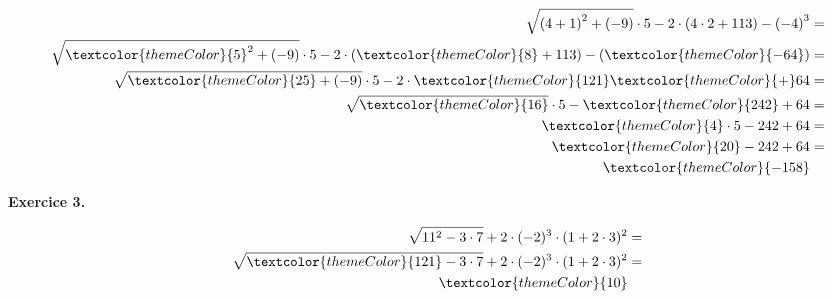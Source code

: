 {\vspace{-30pt}\color{black}
\begin{align*}
\sqrt{\left(4 + 1\right)^2 + \left(-9\right)} \cdot 5 - 2 \cdot \left(4 \cdot 2 + 113\right) - \left(-4\right)^3 &= \\
\sqrt{\textcolor{themeColor}{5}^2 + \left(-9\right)} \cdot 5 - 2 \cdot \left(\textcolor{themeColor}{8} + 113\right) - \left(\textcolor{themeColor}{-64}\right) &= \\
\sqrt{\textcolor{themeColor}{25} + \left(-9\right)} \cdot 5 - 2 \cdot \textcolor{themeColor}{121} \textcolor{themeColor}{+}64 &= \\
\sqrt{\textcolor{themeColor}{16}} \cdot 5 - \textcolor{themeColor}{242} + 64 &= \\
\textcolor{themeColor}{4}\cdot5 - 242 +64 &= \\
\textcolor{themeColor}{20} - 242 +64 &= \\
\textcolor{themeColor}{-158}
\end{align*}
}

\newpage
{\bfseries\color{themeColor}Exercice 3.} 

{\vspace{-30pt}\color{black}
\begin{align*}
\sqrt{11^2 - 3 \cdot 7} + 2 \cdot (-2)^3 \cdot (1 + 2 \cdot 3)^2 &= \\
\sqrt{\textcolor{themeColor}{121} - 3 \cdot 7} + 2 \cdot (-2)^3 \cdot (1 + 2 \cdot 3)^2 &= \\
\textcolor{themeColor}{10}
\end{align*}
}
